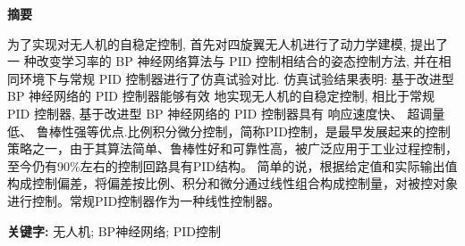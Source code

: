 \documentclass[UTF8,a4paper,10pt,nocolorlinks]{ctexart}
\begin{document}

    \renewcommand{\contentsname}{目录}  %
    \tableofcontents
    \thispagestyle{empty} %
    \clearpage %


     
     \renewcommand{\abstractname}{摘要}  %
     \begin{center}
        \large{\textbf{摘要}}
    \end{center}
    \begin{adjustwidth}{0cm}{0cm}
        \hspace{2em}为了实现对无人机的自稳定控制, 首先对四旋翼无人机进行了动力学建模, 提出了一
        种改变学习率的 BP 神经网络算法与 PID 控制相结合的姿态控制方法, 并在相同环境下与常规 PID
        控制器进行了仿真试验对比. 仿真试验结果表明: 基于改进型 BP 神经网络的 PID 控制器能够有效
        地实现无人机的自稳定控制, 相比于常规 PID 控制器, 基于改进型 BP 神经网络的 PID 控制器具有
        响应速度快、 超调量低、 鲁棒性强等优点.比例积分微分控制，简称PID控制，是最早发展起来的控制策略之一，由于其算法简单、鲁棒性好和可靠性高，被广泛应用于工业过程控制，至今仍有90\%左右的控制回路具有PID结构。
        简单的说，根据给定值和实际输出值构成控制偏差，将偏差按比例、积分和微分通过线性组合构成控制量，对被控对象进行控制。常规PID控制器作为一种线性控制器。
        
        \begin{flushleft}
        \par\textbf{关键字: } 无人机; BP神经网络; PID控制 %
        \end{flushleft}
    \end{adjustwidth}
    \thispagestyle{empty} %
    \clearpage %
 
\end{document}
